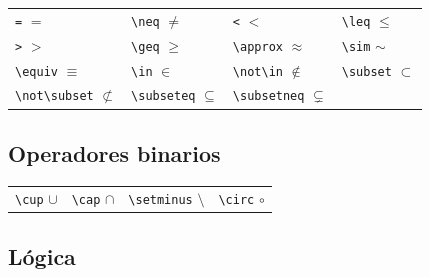 \documentclass[
  a4paper,
]{scrreport}
\theoremstyle{definition}
\theoremstyle{remark}
\begin{document}
\begin{longtable}[]{@{}
  >{\raggedright\arraybackslash}p{}
  >{\raggedright\arraybackslash}p{}
  >{\raggedright\arraybackslash}p{}
  >{\raggedright\arraybackslash}p{}@{}}
\toprule\noalign{}
\endhead
\bottomrule\noalign{}
\endlastfoot
\texttt{=} \(=\) & \texttt{\textbackslash{}neq} \(\neq\) &
\texttt{\textless{}} \(<\) & \texttt{\textbackslash{}leq} \(\leq\) \\
\texttt{\textgreater{}} \(>\) & \texttt{\textbackslash{}geq} \(\geq\) &
\texttt{\textbackslash{}approx} \(\approx\) &
\texttt{\textbackslash{}sim} \(\sim\) \\
\texttt{\textbackslash{}equiv} \(\equiv\) & \texttt{\textbackslash{}in}
\(\in\) & \texttt{\textbackslash{}not\textbackslash{}in} \(\not\in\) &
\texttt{\textbackslash{}subset} \(\subset\) \\
\texttt{\textbackslash{}not\textbackslash{}subset} \(\not\subset\) &
\texttt{\textbackslash{}subseteq} \(\subseteq\) &
\texttt{\textbackslash{}subsetneq} \(\subsetneq\) & \\
\end{longtable}

\subsection{Operadores binarios}\label{operadores-binarios}

\begin{longtable}[]{@{}
  >{\raggedright\arraybackslash}p{}
  >{\raggedright\arraybackslash}p{}
  >{\raggedright\arraybackslash}p{}
  >{\raggedright\arraybackslash}p{}@{}}
\toprule\noalign{}
\endhead
\bottomrule\noalign{}
\endlastfoot
\texttt{\textbackslash{}cup} \(\cup\) & \texttt{\textbackslash{}cap}
\(\cap\) & \texttt{\textbackslash{}setminus} \(\setminus\) &
\texttt{\textbackslash{}circ} \(\circ\) \\
\end{longtable}

\subsection{Lógica}\label{luxf3gica}
\end{document}
